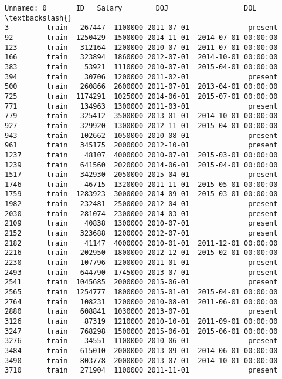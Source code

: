 \documentclass[11pt]{article}
\makeatletter
\newcommand{\boxspacing}{\kern\kvtcb@left@rule\kern\kvtcb@boxsep}
\newcommand{\prompt}[4]{
        \ttfamily\llap{{\color{#2}[#3]:\hspace{3pt}#4}}\vspace{-\baselineskip}
    }
\makeatother
\begin{document}
            \begin{tcolorbox}[breakable, size=fbox, boxrule=.5pt, pad at break*=1mm, opacityfill=0]
\prompt{Out}{outcolor}{17}{\boxspacing}
\begin{Verbatim}[commandchars=\\\{\}]
     Unnamed: 0       ID   Salary        DOJ                  DOL  \textbackslash{}
3         train   267447  1100000 2011-07-01              present
92        train  1250429  1500000 2014-11-01  2014-07-01 00:00:00
123       train   312164  1200000 2010-07-01  2011-07-01 00:00:00
166       train   323894  1860000 2012-07-01  2014-10-01 00:00:00
383       train    53921  1110000 2010-07-01  2015-04-01 00:00:00
394       train    30706  1200000 2011-02-01              present
500       train   260866  2600000 2011-07-01  2013-04-01 00:00:00
725       train  1174291  1025000 2014-06-01  2015-07-01 00:00:00
771       train   134963  1300000 2011-03-01              present
779       train   325412  3500000 2013-01-01  2014-10-01 00:00:00
927       train   329920  1300000 2012-11-01  2015-04-01 00:00:00
943       train   102662  1050000 2010-08-01              present
961       train   345175  2000000 2012-10-01              present
1237      train    48107  4000000 2010-07-01  2015-03-01 00:00:00
1239      train   641560  2020000 2014-06-01  2015-04-01 00:00:00
1517      train   342930  2050000 2015-04-01              present
1746      train    46715  1320000 2011-11-01  2015-05-01 00:00:00
1759      train  1283923  3000000 2014-09-01  2015-03-01 00:00:00
1982      train   232481  2500000 2012-04-01              present
2030      train   281074  2300000 2014-03-01              present
2109      train    40838  1300000 2010-07-01              present
2152      train   323688  1200000 2012-07-01              present
2182      train    41147  4000000 2010-01-01  2011-12-01 00:00:00
2216      train   202950  1800000 2012-12-01  2015-02-01 00:00:00
2230      train   107796  1200000 2011-01-01              present
2493      train   644790  1745000 2013-07-01              present
2541      train  1045685  2000000 2015-06-01              present
2565      train  1254777  1800000 2015-01-01  2015-04-01 00:00:00
2764      train   108231  1200000 2010-08-01  2011-06-01 00:00:00
2880      train   608841  1030000 2013-07-01              present
3126      train    87319  1210000 2010-10-01  2011-09-01 00:00:00
3247      train   768298  1500000 2015-06-01  2015-06-01 00:00:00
3276      train    34551  1100000 2010-06-01              present
3484      train   615010  2000000 2013-09-01  2014-06-01 00:00:00
3490      train   803778  2000000 2013-07-01  2014-10-01 00:00:00
3710      train   271904  1100000 2011-11-01              present


\end{Verbatim}
\end{tcolorbox}
\end{document}
